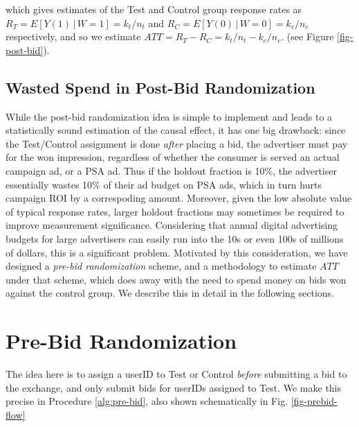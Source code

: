 \documentclass[11pt,a4paper]{article}
\theoremstyle{definition}
\theoremstyle{remark}
\theoremstyle{definition}
\theoremstyle{definition}
\theoremstyle{definition}
\theoremstyle{definition}
\theoremstyle{definition}
\theoremstyle{definition}
\begin{document}
which gives estimates of the Test and Control group response rates as $R_T = E[Y(1)\,|\,W=1] = k_t/n_t$ and $R_C = E[Y(0)\,|\,W=0] = k_c/n_c$ respectively, and so we estimate $ATT = R_T - R_C =  k_t/n_t - k_c/n_c$. 
(see Figure \ref{fig-post-bid}).


\subsection{Wasted Spend in Post-Bid Randomization}
While the post-bid randomization idea is simple to implement and leads to a statistically sound estimation of the causal effect, it has one big drawback: 
since the Test/Control assignment is done {\em after} placing a bid, the advertiser must pay for the won impression, regardless of whether the consumer is served an actual campaign ad, or a PSA ad. 
Thus if the holdout fraction is 10\%, the advertiser essentially wastes 10\% of their ad budget on PSA ads, which in turn hurts campaign ROI by a correspoding amount. 
Moreover, given the low absolute value of typical response rates, larger holdout fractions may sometimes be required to improve measurement significance. 
Considering that annual digital advertising budgets for large advertisers can easily run into the 10s or even 100s of millions of dollars, this is a significant problem. 
Motivated by this consideration, we have designed a {\em pre-bid randomization} scheme, and a methodology to estimate $ATT$ under that scheme, which does away with the need to spend money on bids won against the control group. We describe this in detail in the following sections.


\section{Pre-Bid Randomization} \label{sec-prebid}

The idea here is to assign a userID to Test or Control {\em before} submitting a bid to the exchange, and only submit bids for userIDs assigned to Test. We make this precise in Procedure \ref{alg:pre-bid}, also shown schematically in Fig. \ref{fig-prebid-flow}
\end{document}
